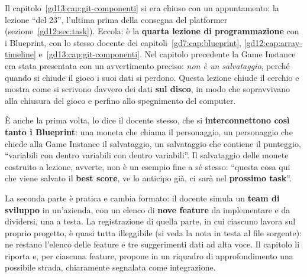 Il capitolo~\ref{gd13:cap:git-componenti} si era chiuso con un appuntamento:
la lezione ``del 23'', l'ultima prima della consegna del platformer
(sezione~\ref{gd12:sec:task}). Eccola: è la \textbf{quarta lezione di
programmazione} con i Blueprint, con lo stesso docente dei
capitoli~\ref{gd7:cap:blueprint}, \ref{gd12:cap:array-timeline}
e~\ref{gd13:cap:git-componenti}. Nel capitolo precedente la Game Instance era
stata presentata con un avvertimento preciso: \emph{non è un salvataggio},
perché quando si chiude il gioco i suoi dati si perdono. Questa lezione chiude
il cerchio e mostra come si scrivono davvero dei dati \textbf{sul disco}, in
modo che sopravvivano alla chiusura del gioco e perfino allo spegnimento del
computer.

È anche la prima volta, lo dice il docente stesso, che si
\textbf{interconnettono così tanto i Blueprint}: una moneta che chiama il
personaggio, un personaggio che chiede alla Game Instance il salvataggio, un
salvataggio che contiene il punteggio, ``variabili con dentro variabili con
dentro variabili''. Il salvataggio delle monete costruito a lezione, avverte,
non è un esempio fine a sé stesso: ``questa cosa qui che viene salvato il
\textbf{best score}, ve lo anticipo già, ci sarà nel \textbf{prossimo task}''.

La seconda parte è pratica e cambia formato: il docente simula un
\textbf{team di sviluppo} in un'azienda, con un elenco di \textbf{nove
feature} da implementare e da dividersi, una a testa. La registrazione di
quella parte, in cui ciascuno lavora sul proprio progetto, è quasi tutta
illeggibile (si veda la nota in testa al file sorgente): ne restano l'elenco
delle feature e tre suggerimenti dati ad alta voce. Il capitolo li riporta e,
per ciascuna feature, propone in un riquadro di approfondimento una possibile
strada, chiaramente segnalata come integrazione.


